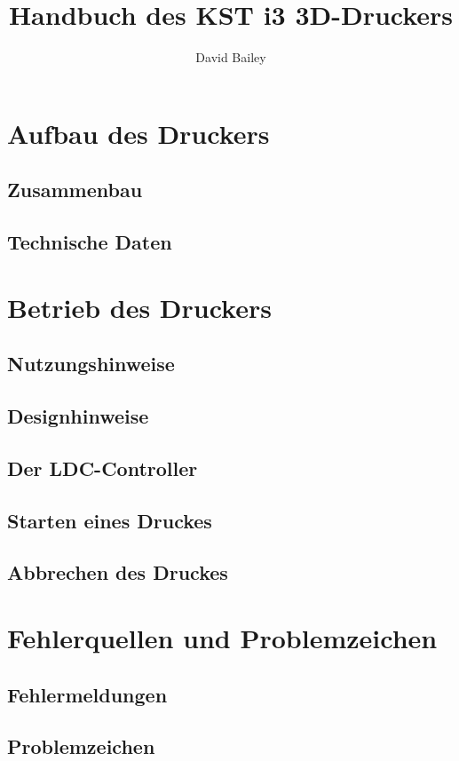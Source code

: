 \documentclass[11pt,a4paper]{article}
\title{Handbuch des KST i3 3D-Druckers}
\author{David Bailey}
\begin{document}
\maketitle
\newpage

\tableofcontents

\newpage
\section{Aufbau des Druckers}
\subsection{Zusammenbau}

\newpage
\subsection{Technische Daten}


\newpage
\section{Betrieb des Druckers}
\subsection{Nutzungshinweise}

\subsection{Designhinweise}

\subsection{Der LDC-Controller}

\subsection{Starten eines Druckes}
\subsection{Abbrechen des Druckes}

\newpage
\section{Fehlerquellen und Problemzeichen}
\subsection{Fehlermeldungen}

\subsection{Problemzeichen}

\end{document}

